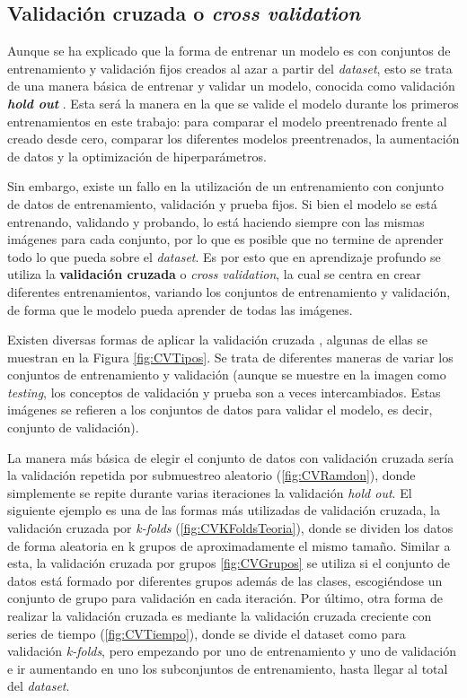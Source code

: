 \documentclass{report}
\begin{document}
\newpage

\subsection{Validación cruzada o \textit{cross validation}}\label{TiposValidacionCruzada}


Aunque se ha explicado que la forma de entrenar un modelo es con conjuntos de entrenamiento y validación fijos creados al azar a partir del \textit{dataset},  esto se trata de una manera básica de entrenar y validar un modelo, conocida como validación \textbf{\textit{hold out}} \cite{HoldOut}. Esta será la manera en la que se valide el modelo durante los primeros entrenamientos en este trabajo: para comparar el modelo preentrenado frente al creado desde cero, comparar los diferentes modelos preentrenados, la aumentación de datos y la optimización de hiperparámetros.


Sin embargo, existe un fallo en la utilización de un entrenamiento con conjunto de datos de entrenamiento, validación y prueba fijos. Si bien el modelo se está entrenando, validando y probando, lo está haciendo siempre con las mismas imágenes para cada conjunto, por lo que es posible que no termine de aprender todo lo que pueda sobre el \textit{dataset}. Es por esto que en aprendizaje profundo se utiliza la \textbf{validación cruzada} o \textit{cross validation}, la cual se centra en crear diferentes entrenamientos, variando los conjuntos de entrenamiento y validación, de forma que le modelo pueda aprender de todas las imágenes.


Existen diversas formas de aplicar la validación cruzada \cite{TiposValidacionCruzada}, algunas de ellas se muestran en la Figura \ref{fig:CVTipos}. Se trata de diferentes maneras de variar los conjuntos de entrenamiento y validación (aunque se muestre en la imagen como \textit{testing}, los conceptos de validación y prueba son a veces intercambiados. Estas imágenes se refieren a los conjuntos de datos para validar el modelo, es decir, conjunto de validación). 

La manera más básica de elegir el conjunto de datos con validación cruzada sería la validación repetida por submuestreo aleatorio (\ref{fig:CVRamdon}), donde simplemente se repite durante varias iteraciones la validación \textit{hold out}. El siguiente ejemplo es una de las formas más utilizadas de validación cruzada, la validación cruzada por \textit{k-folds} (\ref{fig:CVKFoldsTeoria}), donde se dividen los datos de forma aleatoria en k grupos de aproximadamente el mismo tamaño. Similar a esta, la validación cruzada por grupos \ref{fig:CVGrupos} se utiliza si el conjunto de datos está formado por diferentes grupos además de las clases, escogiéndose un conjunto de grupo para validación en cada iteración. Por último, otra forma de realizar la validación cruzada es mediante la validación cruzada creciente con series de tiempo (\ref{fig:CVTiempo}), donde se divide el dataset como para validación \textit{k-folds}, pero empezando por uno de entrenamiento y uno de validación e ir aumentando en uno los subconjuntos de entrenamiento, hasta llegar al total del \textit{dataset}. 
\end{document}
